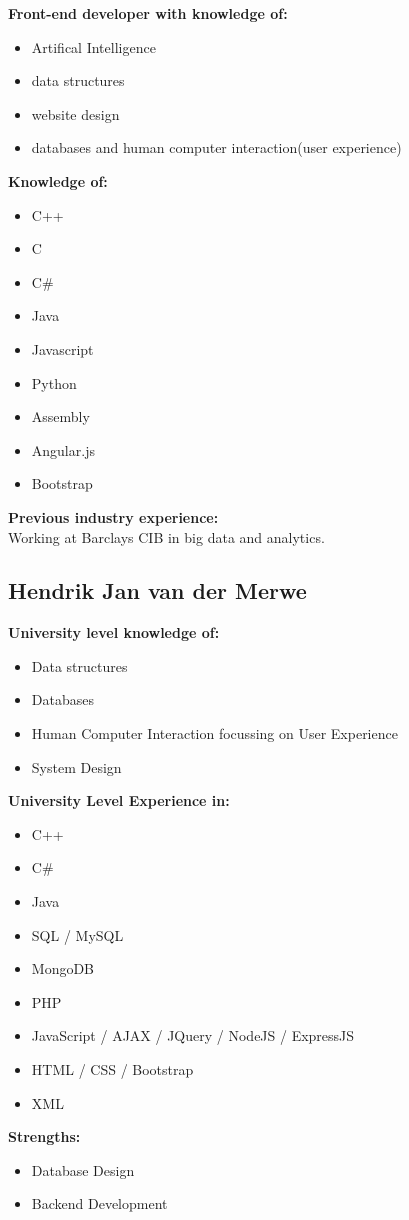 \documentclass{article}
\begin{document}
\textbf{Front-end developer with knowledge of:}
\begin{itemize}
 	\item Artifical Intelligence
 	\item data structures 
 	\item website design 
 	\item databases and human computer interaction(user experience)
 \end{itemize}
\textbf{Knowledge of:}
\begin{itemize}
	\item C++ 
	\item C 
	\item C\# 
	\item Java 
	\item Javascript 
	\item Python 
	\item Assembly 
	\item Angular.js  
	\item Bootstrap
 \end{itemize}
\textbf{Previous industry experience:}\\
Working at Barclays CIB in big data and analytics.
\\
\subsection {Hendrik Jan van der Merwe} 
\textbf{University level knowledge of:}
\begin{itemize}
 	\item Data structures
 	\item Databases
 	\item Human Computer Interaction focussing on User Experience
 	\item System Design
\end{itemize}
\textbf{University Level Experience in:}
\begin{itemize}
	\item C++
	\item C\#
	\item Java
	\item SQL / MySQL
	\item MongoDB
	\item PHP
	\item JavaScript / AJAX / JQuery / NodeJS / ExpressJS
	\item HTML / CSS / Bootstrap
	\item XML
\end{itemize}
\textbf{Strengths:}
\begin{itemize}
	\item Database Design
	\item Backend Development
\end{itemize}
\end{document}

